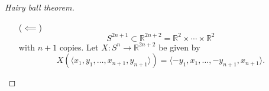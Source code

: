 \begin{proof}[Hairy ball theorem]
\begin{itemize}
  \item[($\impliedby$)]{
    $$
            S^{2n + 1}
    \subset \mathbb{R}^{2n + 2}
    = \mathbb{R}^2 \times \cdots \times \mathbb{R}^2
    $$
    with $n + 1$ copies. Let
    $X: S^n \to \mathbb{R}^{2n + 2}$
    be given by
    $$
      X(\langle x_1, y_1, \dots, x_{n+1}, y_{n+1}\rangle)
    = \langle -y_1, x_1, \dots, -y_{n+1}, x_{n+1} \rangle.
    $$
  }
\end{itemize}
\end{proof}
